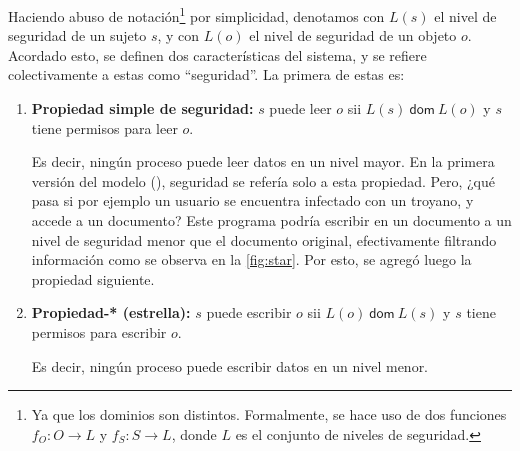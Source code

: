 \documentclass{article}
\theoremstyle{definition}
\begin{document}
Haciendo abuso de notación\footnote{Ya que los dominios son distintos.
  Formalmente, se hace uso de dos funciones $f_O\colon O \to L$ y $f_S\colon S
\to L$, donde $L$ es el conjunto de niveles de seguridad.} por simplicidad,
denotamos con $L(s)$ el nivel de seguridad de un sujeto $s$, y con $L(o)$ el 
nivel de seguridad de un objeto $o$. Acordado esto, se definen dos
características del sistema, y se refiere colectivamente a estas como
``seguridad''. La primera de estas es:
\begin{enumerate}
  \item \textbf{Propiedad simple de seguridad\footnotemark:} $s$ puede leer $o$ sii $L(s)~\mathsf{dom}~L(o)$ y $s$ tiene permisos para leer $o$. 


    Es decir, ningún proceso puede leer datos en un nivel mayor. En la primera
    versión del modelo (\cite{BLP73}), seguridad se refería solo a esta
    propiedad.  Pero, ¿qué pasa si por ejemplo un usuario se encuentra infectado
    con un troyano, y accede a un documento? Este programa podría escribir en un
    documento a un nivel de seguridad menor que el documento original,
    efectivamente filtrando información como se observa en la
    \autoref{fig:star}. Por esto, se agregó luego la propiedad siguiente.
  \item \textbf{Propiedad-* (estrella)\footnotemark:} $s$ puede escribir $o$ sii $L(o)~\mathsf{dom}~L(s)$ y $s$ tiene permisos para escribir $o$.

Es decir, ningún proceso puede escribir datos en un nivel menor. 
\end{enumerate}
\end{document}
